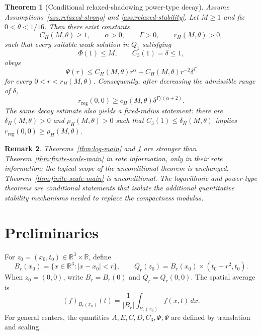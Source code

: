 \documentclass[pdflatex,sn-mathphys-num]{sn-jnl}
\numberwithin{equation}{section}
\theoremstyle{thmstyleone}
\newtheorem{theorem}{Theorem}[section]
\theoremstyle{thmstylethree}
\newtheorem{remark}[theorem]{Remark}
\newcommand{\R}{\mathbb R}
\newcommand{\reg}{\mathrm{reg}}
\newcommand{\dx}{\,dx}
\begin{document}
\begin{theorem}[Conditional relaxed-shadowing power-type decay]
\label{thm:power-main}
Assume Assumptions~\ref{ass:relaxed-strong} and \ref{ass:relaxed-stability}.  Let \(M\ge1\) and fix \(0<\theta<1/16\).  Then there exist constants
\[
        C_H(M,\theta)\ge1,
        \qquad
        \alpha>0,
        \qquad
        \Gamma>0,
        \qquad
        r_H(M,\theta)>0,
\]
such that every suitable weak solution in \(Q_1\) satisfying
\[
        \Phi(1)\le M,
        \qquad
        C_3(1)=\delta\le1,
\]
obeys
\begin{equation}
        \Psi(r)
        \le C_H(M,\theta)r^{\alpha}+C_H(M,\theta)r^{-2}\delta^{\Gamma}
        \label{eq:power-decay-main}
\end{equation}
for every \(0<r<r_H(M,\theta)\).  Consequently, after decreasing the admissible range of \(\delta\),
\begin{equation}
        r_{\reg}(0,0)
        \ge c_H(M,\theta)\delta^{\Gamma/(\alpha+2)}.
        \label{eq:power-radius-main}
\end{equation}
The same decay estimate also yields a fixed-radius statement: there are \(\delta_H(M,\theta)>0\) and \(\rho_H(M,\theta)>0\) such that \(C_3(1)\le\delta_H(M,\theta)\) implies \(r_{\reg}(0,0)\ge\rho_H(M,\theta)\).
\end{theorem}

\begin{remark}
Theorems~\ref{thm:log-main} and \ref{thm:power-main} are stronger than Theorem~\ref{thm:finite-scale-main} in rate information, only in their rate information; the logical scope of the unconditional theorem is unchanged.  Theorem~\ref{thm:finite-scale-main} is unconditional.  The logarithmic and power-type theorems are conditional statements that isolate the additional quantitative stability mechanisms needed to replace the compactness modulus.
\end{remark}

\section{Preliminaries}
\label{sec:preliminaries}

For \(z_0=(x_0,t_0)\in\R^3\times\R\), define
\[
        B_r(x_0)=\{x\in\R^3:|x-x_0|<r\},
        \qquad
        Q_r(z_0)=B_r(x_0)\times(t_0-r^2,t_0).
\]
When \(z_0=(0,0)\), write \(B_r=B_r(0)\) and \(Q_r=Q_r(0,0)\).  The spatial average is
\[
        (f)_{B_r(x_0)}(t)=\frac1{|B_r|}\int_{B_r(x_0)}f(x,t)\dx.
\]
For general centers, the quantities \(A,E,C,D,C_3,\Phi,\Psi\) are defined by translation and scaling.
\end{document}

